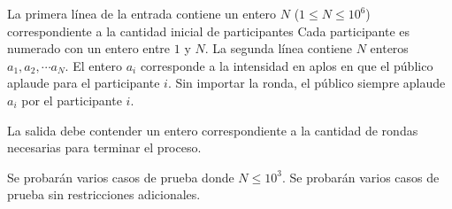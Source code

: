 \documentclass{oci}
\begin{document}
\begin{inputDescription}
La primera línea de la entrada contiene un entero $N$
($1 \leq N \leq 10^6$) correspondiente a la cantidad
inicial de participantes
%
Cada participante es numerado con un entero entre $1$ y $N$.
%
La segunda línea contiene $N$ enteros $a_1, a_2, \cdots a_N$.
%
El entero $a_i$ corresponde a la intensidad en aplos en que el público
aplaude para el participante $i$.
%
Sin importar la ronda, el público siempre aplaude $a_i$ por el participante
$i$.
\end{inputDescription}

\begin{outputDescription}
La salida debe contender un entero correspondiente a la cantidad de rondas
necesarias para terminar el proceso.
\end{outputDescription}

\begin{scoreDescription}
   Se probarán varios casos de prueba donde $N \leq 10^3$.
   Se probarán varios casos de prueba sin restricciones adicionales.
\end{scoreDescription}
\end{document}
